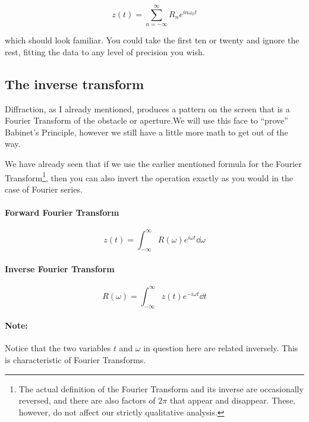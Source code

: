 \begin{equation*}
z(t) = \sum_{n = -\infty}^\infty R_n e^{i n \omega_0 t}
\end{equation*}

which should look familiar. You could take the first ten or twenty and ignore the rest, fitting the data to any level of precision you wish.

\subsection{The inverse transform}

Diffraction, as I already mentioned, produces a pattern on the screen that is a Fourier Transform of the obstacle or aperture.We will use this face to ``prove'' Babinet's Principle, however we still have a little more math to get out of the way. 

We have already seen that if we use the earlier mentioned formula for the Fourier Transform\footnote{The actual definition of the Fourier Transform and its inverse are occasionally reversed, and there are also factors of $2\pi$ that appear and disappear. These, however, do not affect our strictly qualitative analysis.}, then you can also invert the operation exactly as you would in the case of Fourier series. 

\begin{tcolorbox}

\paragraph{Forward Fourier Transform}

\begin{equation*}
z(t) = \int^\infty_{-\infty} R(\omega) e^{i \omega t} \dd \omega
\end{equation*}

\paragraph{Inverse Fourier Transform}

\begin{equation*}
R(\omega) = \int^\infty_{-\infty} z(t) e^{-i \omega t} \dd t
\end{equation*}

\paragraph{Note: } Notice that the two variables $t$ and $\omega$ in question here are related inversely. This is characteristic of Fourier Transforms.

\end{tcolorbox}

